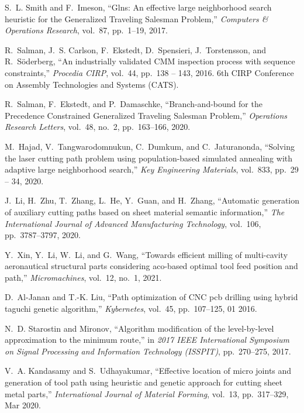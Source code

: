 \begin{thebibliography}{10}
S.~L. Smith and F.~Imeson, ``Glns: An effective large neighborhood search
  heuristic for the {G}eneralized {T}raveling {S}alesman {P}roblem,'' {\em
  Computers {\&} Operations Research}, vol.~87, pp.~1--19, 2017.

R.~Salman, J.~S. Carlson, F.~Ekstedt, D.~Spensieri, J.~Torstensson, and
  R.~S\"{o}derberg, ``An industrially validated {CMM} inspection process with
  sequence constraints,'' {\em Procedia CIRP}, vol.~44, pp.~138 -- 143, 2016.
\newblock 6th CIRP Conference on Assembly Technologies and Systems (CATS).

R.~Salman, F.~Ekstedt, and P.~Damaschke, ``Branch-and-bound for the
  {P}recedence {C}onstrained {G}eneralized {T}raveling {S}alesman {P}roblem,''
  {\em Operations Research Letters}, vol.~48, no.~2, pp.~163--166, 2020.

M.~Hajad, V.~Tangwarodomnukun, C.~Dumkum, and C.~Jaturanonda, ``Solving the
  laser cutting path problem using population-based simulated annealing with
  adaptive large neighborhood search,'' {\em Key Engineering Materials},
  vol.~833, pp.~29 -- 34, 2020.

J.~Li, H.~Zhu, T.~Zhang, L.~He, Y.~Guan, and H.~Zhang, ``Automatic generation
  of auxiliary cutting paths based on sheet material semantic information,''
  {\em The International Journal of Advanced Manufacturing Technology},
  vol.~106, pp.~3787--3797, 2020.

Y.~Xin, Y.~Li, W.~Li, and G.~Wang, ``Towards efficient milling of multi-cavity
  aeronautical structural parts considering aco-based optimal tool feed
  position and path,'' {\em Micromachines}, vol.~12, no.~1, 2021.

D.~Al-Janan and T.-K. Liu, ``Path optimization of {CNC} pcb drilling using
  hybrid taguchi genetic algorithm,'' {\em Kybernetes}, vol.~45, pp.~107--125,
  01 2016.

N.~D. Starostin and Mironov, ``Algorithm modification of the level-by-level
  approximation to the minimum route,'' in {\em 2017 IEEE International
  Symposium on Signal Processing and Information Technology (ISSPIT)},
  pp.~270--275, 2017.

V.~A. Kandasamy and S.~Udhayakumar, ``{Effective location of micro joints and
  generation of tool path using heuristic and genetic approach for cutting
  sheet metal parts},'' {\em International Journal of Material Forming},
  vol.~13, pp.~317--329, Mar 2020.


\end{thebibliography}
